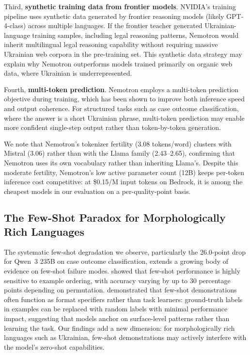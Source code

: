\documentclass[11pt,a4paper]{article}
\begin{document}
Third, \textbf{synthetic training data from frontier models}. NVIDIA's training pipeline uses synthetic data generated by frontier reasoning models (likely GPT-4-class) across multiple languages. If the frontier teacher generated Ukrainian-language training samples, including legal reasoning patterns, Nemotron would inherit multilingual legal reasoning capability without requiring massive Ukrainian web corpora in the pre-training set. This synthetic data strategy may explain why Nemotron outperforms models trained primarily on organic web data, where Ukrainian is underrepresented.

Fourth, \textbf{multi-token prediction}. Nemotron employs a multi-token prediction objective during training, which has been shown to improve both inference speed and output coherence. For structured tasks such as case outcome classification, where the answer is a short Ukrainian phrase, multi-token prediction may enable more confident single-step output rather than token-by-token generation.

We note that Nemotron's tokenizer fertility (3.08 tokens/word) clusters with Mistral (3.06) rather than with the Llama family (2.43--2.65), confirming that Nemotron uses its own vocabulary rather than inheriting Llama's. Despite this moderate fertility, Nemotron's low active parameter count (12B) keeps per-token inference cost competitive: at \$0.15/M input tokens on Bedrock, it is among the cheapest models in our evaluation on a per-quality-point basis.

\subsection{The Few-Shot Paradox for Morphologically Rich Languages}

The systematic few-shot degradation we observe, particularly the 26.0-point drop for Qwen~3 235B on case outcome classification, extends a growing body of evidence on few-shot failure modes. \citet{lu2022order} showed that few-shot performance is highly sensitive to example ordering, with accuracy varying by up to 30 percentage points depending on permutation. \citet{min2022rethinking} demonstrated that few-shot demonstrations often function as format specifiers rather than task learners: ground-truth labels in examples can be replaced with random labels with minimal performance impact, suggesting that models anchor on surface-level patterns rather than learning the task. Our findings add a new dimension: for morphologically rich languages such as Ukrainian, few-shot demonstrations may actively interfere with the model's zero-shot capabilities.
\end{document}
